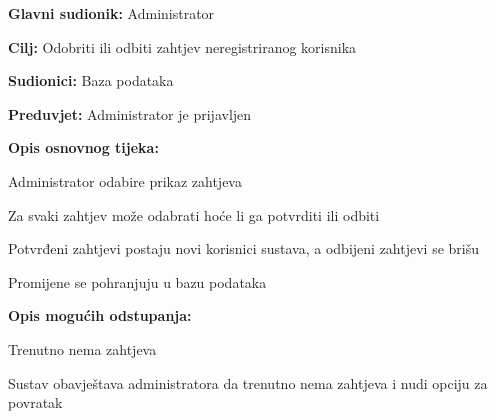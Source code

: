 				\noindent {}
				\begin{packed_item}
					
					\item \textbf{Glavni sudionik:} Administrator
					\item  \textbf{Cilj:} Odobriti ili odbiti zahtjev neregistriranog korisnika
					\item  \textbf{Sudionici:} Baza podataka
					\item  \textbf{Preduvjet:} Administrator je prijavljen
					\item  \textbf{Opis osnovnog tijeka:}
					
					\item[] \begin{packed_enum}
						
						\item Administrator odabire prikaz zahtjeva
						\item Za svaki zahtjev može odabrati hoće li ga potvrditi ili odbiti
						\item Potvrđeni zahtjevi postaju novi korisnici sustava, a odbijeni zahtjevi se brišu
						\item Promijene se pohranjuju u bazu podataka
						
					\end{packed_enum}
					
					\item  \textbf{Opis mogućih odstupanja:}
					
					\item[] \begin{packed_item}
						
						\item[2.a] Trenutno nema zahtjeva
						\item[] \begin{packed_enum}
							
							\item Sustav obavještava administratora da trenutno nema zahtjeva i nudi opciju za povratak
						\end{packed_enum}
						
					\end{packed_item}
					
					\end{packed_item}
			
